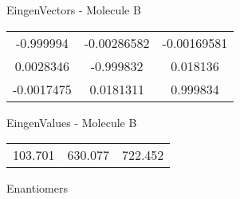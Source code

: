 \begin{multicols}{2}
\begin{center}
\vtab
 EingenVectors - Molecule B     \\
\vtab
\begin{tabular}{|c c c|}
-0.999994	 & 	-0.00286582	 & 	-0.00169581	 \\
0.0028346	 & 	-0.999832	 & 	0.018136	 \\
-0.0017475	 & 	0.0181311	 & 	0.999834
\end{tabular}

\vtab
 EingenValues - Molecule B     \\
\vtab
\begin{tabular}{|c c c|}
103.701	 & 	630.077	 & 	722.452	 \\
\end{tabular}

\end{center}
\end{multicols}
\begin{center}
\vtab
\vtab
\textcolor{NavyBlue}{\Large Enantiomers}
\end{center}

 \newpage

